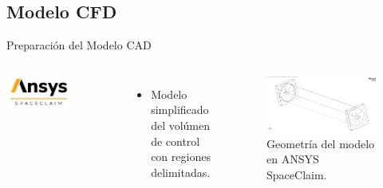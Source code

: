 \subsection{Modelo CFD}
\begin{frame}{Preparación del Modelo CAD}
\begin{columns}
\centering
\includegraphics[height=0.3\textwidth]{dump/Spaceclaim.png}
\begin{itemize}
    \item Modelo simplificado del volúmen de control con regiones delimitadas.
\end{itemize}
        \begin{block}{}
            \begin{figure}[ht!]
                \centering
                \includegraphics[width=\textwidth]{dump/space.png}
                \caption{Geometría del modelo en ANSYS SpaceClaim.}
            \end{figure}
        \end{block}  
\end{columns}
\end{frame}

